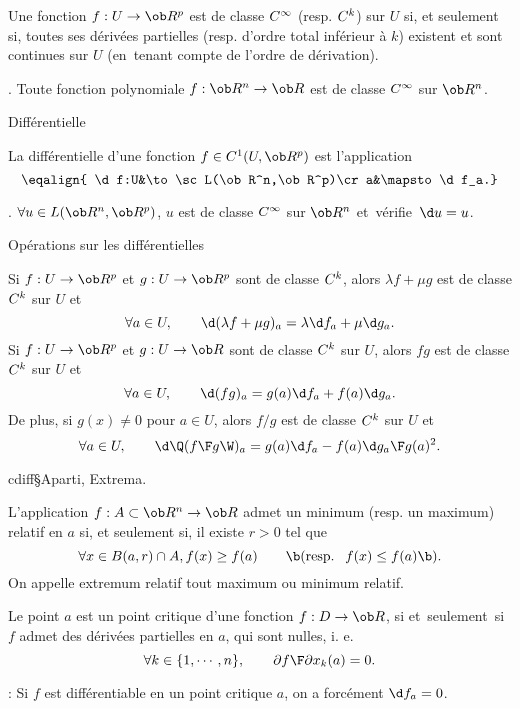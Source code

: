 \Propriete [$U$ ouvert de $\ob R^n$, $k\ge1$] 
Une fonction $f:U\to\ob R^p$ est de classe $\sc C^\infty$ (resp. $\sc C^k$) sur $U$ si, et seulement si, toutes ses d\'eriv\'ees partielles 
(resp. d'ordre total inf\'erieur \`a $k$) existent et sont continues sur $U$ 
(en~tenant compte de l'ordre de d\'erivation). 

\Exemple. Toute fonction polynomiale $f:\ob R^n\to\ob R$ est de classe $\sc C^\infty$ 
sur $\ob R^n$. 

\Concept Diff\'erentielle

\Definition [$U$ ouvert de $\ob R^n$] 
La diff\'erentielle d'une fonction $f\in\sc C^1(U,\ob R^p)$ est l'application 
$$
\eqalign{
\d f:U&\to\sc L(\ob R^n,\ob R^p)\cr 
a&\mapsto\d f_a.}
$$
\bigskip

\Exemple. $\forall u\in\sc L(\ob R^n,\ob R^p)$, $u$ 
est de classe $\sc C^\infty$ sur $\ob R^n$ et~v\'erifie~$\d u=u$. 
\bigskip 

\Concept Op\'erations sur les diff\'erentielles

Si $f:U\to\ob R^p$ et $g:U\to\ob R^p$ sont de classe $\sc C^k$, alors $\lambda f+\mu g$ est de classe $\sc C^k$ sur $U$ et 
$$
\forall a\in U, \qquad \d(\lambda f+\mu g)_a=\lambda\d f_a+\mu\d g_a.
$$
Si $f:U\to\ob R^p$ et $g:U\to\ob R$ sont de classe $\sc C^k$ sur $U$, alors $fg$ est de classe $\sc C^k$ sur $U$ et 
$$
\forall a\in U, \qquad \d(fg)_a=g(a)\d f_a +f(a)\d g_a.
$$ 
De plus, si $g(x)\neq0$ pour $a\in U$, alors $f/g$ est de classe $\sc C^k$ sur $U$ et 
$$
\forall a\in U, \qquad \d\Q({f\F g}\W)_a={g(a)\d f_a-f(a)\d g_a\F g(a)^2}.
$$ 

\Subsection cdiff§Aparti, Extrema.


\Definition [$a\in A\subset\ob R^n$] 
L'application $f:A\subset\ob R^n\to\ob R$ admet un minimum (resp. un maximum) relatif en $a$ si, et seulement si, 
il existe $r>0$ tel que 
$$
\forall x\in B(a,r)\cap A, f(x)\ge f(a)\qquad\b(\mbox{resp. }\ f(x)\le f(a)\b).
$$
On appelle extremum relatif tout maximum ou minimum relatif. 

\Definition [$a\in D\subset\ob R^n$] 
Le point $a$ est un point critique d'une fonction $f:D\to \ob R$, si et~seulement~si $f$ admet des d\'eriv\'ees partielles en $a$, 
qui sont nulles, i. e. 
$$
\forall k\in\{1,\cdots, n\}, \qquad {\partial f\F\partial x_k}(a)=0.
$$

\Remarque : Si $f$ est diff\'erentiable en un point critique $a$, on a forc\'ement $\d f_a=0$. 
\bigskip


